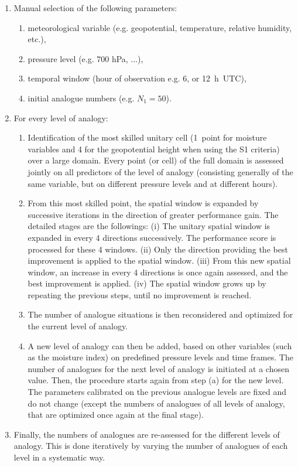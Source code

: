 \documentclass[review]{elsarticle}
\begin{document}
\begin{enumerate}
	\item Manual selection of the following parameters:
	\begin{enumerate}
		\item meteorological variable (e.g. geopotential, temperature, relative humidity, etc.),
		\item pressure level (e.g. 700 hPa, ...),
		\item temporal window (hour of observation \textendash e.g. 6, or 12~h~UTC),
		\item initial analogue numbers (e.g. $N_{1}=50$).
	\end{enumerate}
	
	\item For every level of analogy:
	\begin{enumerate}
		\item Identification of the most skilled unitary cell (1~point for moisture variables and 4 for the geopotential height when using the S1 criteria) over a large domain. Every point (or cell) of the full domain is assessed jointly on all predictors of the level of analogy (consisting generally of the same variable, but on different pressure levels and at different hours).
		\item From this most skilled point, the spatial window is expanded by successive iterations in the direction of greater performance gain. The detailed stages are the followings: (i) The unitary spatial window is expanded in every 4 directions successively. The performance score is processed for these 4 windows. (ii) Only the direction providing the best improvement is applied to the spatial window. (iii) From this new spatial window, an increase in every 4 directions is once again assessed, and the best improvement is applied. (iv) The spatial window grows up by repeating the previous steps, until no improvement is reached.
		\item The number of analogue situations is then reconsidered and optimized for the current level of analogy.
		\item A new level of analogy can then be added, based on other variables (such as the moisture index) on predefined pressure levels and time frames. The number of analogues for the next level of analogy is initiated at a chosen value. Then, the procedure starts again from step (a) for the new level. The parameters calibrated on the previous analogue levels are fixed and do not change (except the numbers of analogues of all levels of analogy, that are optimized once again at the final stage). 
	\end{enumerate}
	\item Finally, the numbers of analogues are re-assessed for the different levels of analogy. This is done iteratively by varying the number of analogues of each level in a systematic way.
\end{enumerate}
\end{document}
